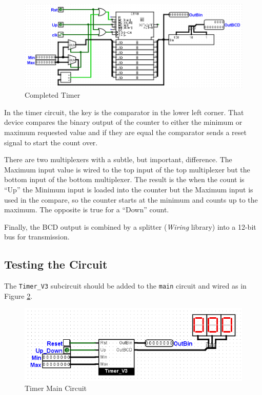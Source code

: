 \begin{figure}[H]
	\centering
	\includegraphics[width=\maxwidth{.95\linewidth}]{gfx/07-01}
	\caption{Completed Timer}
	\label{fig:07-01}
\end{figure}

In the timer circuit, the key is the comparator in the lower left corner. That device compares the binary output of the counter to either the minimum or maximum requested value and if they are equal the comparator sends a reset signal to start the count over. 

There are two multiplexers with a subtle, but important, difference. The Maximum input value is wired to the top input of the top multiplexer but the bottom input of the bottom multiplexer. The result is the when the count is ``Up'' the Minimum input is loaded into the counter but the Maximum input is used in the compare, so the counter starts at the minimum and counts up to the maximum. The opposite is true for a ``Down'' count.

Finally, the BCD output is combined by a splitter (\textit{Wiring} library) into a 12-bit bus for transmission.

\subsection{Testing the Circuit}

The \lstinline[columns=fixed]|Timer_V3| subcircuit should be added to the \lstinline[columns=fixed]|main| circuit and wired as in Figure \ref{fig:07-02}.

\begin{figure}[H]
	\centering
	\includegraphics[width=\maxwidth{.95\linewidth}]{gfx/07-02}
	\caption{Timer Main Circuit}
	\label{fig:07-02}
\end{figure}
 
